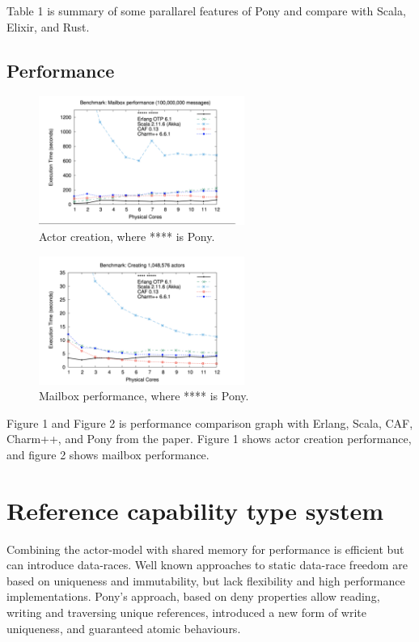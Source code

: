 \documentclass{article}
\begin{document}
\begin{multicols}{2}
Table 1 is summary of some parallarel features of Pony and compare with Scala, Elixir, and Rust.

\subsection{Performance}


\begin{figure}
\centering 		\includegraphics[width=0.6\textwidth]{a}
\caption{Actor creation, where **** is Pony. \cite{type-proof-paper}}
\end{figure}



\begin{figure}
\centering 		\includegraphics[width=0.6\textwidth]{b}
\caption{Mailbox performance, where **** is Pony. \cite{type-proof-paper}}
\end{figure}


Figure 1 and Figure 2 is performance comparison graph with Erlang, Scala, CAF, Charm++, and Pony from the paper\cite{type-proof-paper}.
Figure 1 shows actor creation performance, and figure 2 shows mailbox performance.


\section{Reference capability type system}
Combining the actor-model with shared memory for performance is efficient but can introduce data-races. Well known approaches to static data-race freedom are based on uniqueness and immutability, but lack flexibility and high performance implementations. Pony's approach, based on deny properties allow reading, writing and traversing unique references, introduced a new form of write uniqueness, and guaranteed atomic behaviours.


\end{multicols}
\end{document}
